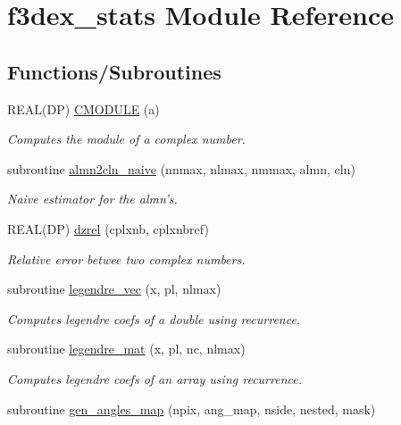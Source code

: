 \hypertarget{namespacef3dex__stats}{
\section{f3dex\_\-stats Module Reference}
\label{namespacef3dex__stats}
}
\subsection*{Functions/Subroutines}
\begin{DoxyCompactItemize}
\item 
REAL(DP) \hyperlink{namespacef3dex__stats_a2c704cb2c5b38f77b70a5c9783660912}{CMODULE} (a)
\begin{DoxyCompactList}\small\item\em Computes the module of a complex number. \end{DoxyCompactList}\item 
subroutine \hyperlink{namespacef3dex__stats_af82543b20c426be1736a4fed0d1ca80c}{almn2cln\_\-naive} (nnmax, nlmax, nmmax, almn, cln)
\begin{DoxyCompactList}\small\item\em Naive estimator for the almn's. \end{DoxyCompactList}\item 
REAL(DP) \hyperlink{namespacef3dex__stats_afc9d6ca61536648a01f8b6769080283e}{dzrel} (cplxnb, cplxnbref)
\begin{DoxyCompactList}\small\item\em Relative error betwee two complex numbers. \end{DoxyCompactList}\item 
subroutine \hyperlink{namespacef3dex__stats_a1f360b2a41b5a63c3379390a55ef07b2}{legendre\_\-vec} (x, pl, nlmax)
\begin{DoxyCompactList}\small\item\em Computes legendre coefs of a double using recurrence. \end{DoxyCompactList}\item 
subroutine \hyperlink{namespacef3dex__stats_aa2fb45e013179295e3b876ced9eff015}{legendre\_\-mat} (x, pl, nc, nlmax)
\begin{DoxyCompactList}\small\item\em Computes legendre coefs of an array using recurrence. \end{DoxyCompactList}\item 
subroutine \hyperlink{namespacef3dex__stats_ac34a6421249816395b51048aa0a3dde3}{gen\_\-angles\_\-map} (npix, ang\_\-map, nside, nested, mask)

\end{DoxyCompactItemize}
